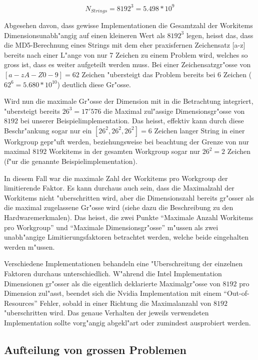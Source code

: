 \begin{refsection}
\[
  N_{Strings} = 8192^3 = 5.498*10^{9}
\]

Abgesehen davon, dass gewisse Implementationen die Gesamtzahl der 
Workitems Dimensionsunabh"angig auf einen kleineren Wert als  $8192^3$
legen, heisst das, dass die MD5-Berechnung eines Strings mit dem eher 
praxisfernen Zeichensatz [a-z] bereits nach einer L"ange von nur
7 Zeichen zu einem Problem wird, welches so gross ist, dass es weiter
aufgeteilt werden muss. Bei einer Zeichensatzgr"osse
von $[a-zA-Z0-9] = 62$ Zeichen "ubersteigt das Problem bereits bei 6
Zeichen ($62^6 = 5.680 * 10^{10}$) deutlich diese Gr"osse.

Wird nun die maximale Gr"osse der Dimension mit in die Betrachtung
integriert, "ubersteigt bereits $26^3 = 17'576$ die Maximal zul"assige
Dimensionsgr"osse von $8192$ bei unserer Beispielimplementation. Das heisst,
effektiv kann durch diese Beschr"ankung sogar nur ein $[26^2, 26^2, 26^2] = 6$ 
Zeichen langer String in einer Workgroup gepr"uft werden, beziehungsweise bei 
beachtung der Grenze von nur maximal $8192$ Workitems in der gesamten Workgroup 
sogar nur $26^2 = 2$ Zeichen (f"ur die genannte Beispielimplementation).

In diesem Fall war die maximale Zahl der Workitems pro Workgroup der limitierende 
Faktor. Es kann durchaus auch sein, dass die Maximalzahl der Workitems nicht 
"uberschritten wird, aber die Dimensionszahl bereits gr"osser als die maximal
zugelassene Gr"osse wird (siehe dazu die Beschreibung zu den Hardwaremerkmalen).
Das heisst, die zwei Punkte ``Maximale Anzahl Workitems pro Workgroup'' und 
``Maximale Dimensionsgr"osse'' m"ussen als zwei unabh"angige Limitierungsfaktoren
betrachtet werden, welche beide eingehalten werden m"ussen.

Verschiedene Implementationen behandeln eine "Uberschreitung der einzelnen
Faktoren durchaus unterschiedlich. W"ahrend
die Intel Implementation Dimensionen gr"osser als die eigentlich deklarierte
Maximalgr"osse von $8192$ pro Dimension zul"asst, beendet sich die Nvidia 
Implementation mit einem ``Out-of-Resources'' Fehler, sobald in einer Richtung 
die Maximalanzahl von $8192$ "uberschritten wird. Das genaue Verhalten der
jeweils verwendeten Implementation sollte vorg"angig abgekl"art oder
zumindest ausprobiert werden. 


\subsection{Aufteilung von grossen Problemen}


\end{refsection}
